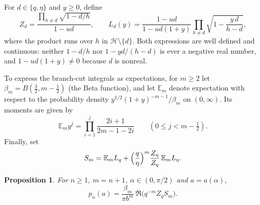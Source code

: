 \documentclass[11pt]{amsart}
\newtheorem{proposition}[theorem]{Proposition}
\theoremstyle{remark}
\newcommand{\E}{\mathbb{E}}
\begin{document}
For $d\in\{q,\eta\}$ and $y\ge0$, define
\[
 Z_d=\frac{\prod_{h\ne d}\sqrt{1-d/h}}{1-ud},\qquad
 L_d(y)=\frac{1-ud}{1-ud(1+y)}\prod_{h\ne d}\sqrt{1-\frac{y\,d}{h-d}},
\]
where the product runs over $h$ in $\mathcal H\setminus\{d\}$. Both
expressions are well defined and continuous: neither $1-d/h$ nor
$1-yd/(h-d)$ is ever a negative real number, and $1-ud(1+y)\ne0$ because $d$
is nonreal.

To express the branch-cut integrals as expectations, for $m\ge2$ let
$\beta_m=B(\tfrac32,m-\tfrac12)$ (the Beta function), and let $\E_m$ denote
expectation with respect to the probability density
$y^{1/2}(1+y)^{-m-1}/\beta_m$ on $(0,\infty)$. Its moments are given by
\begin{equation}\label{eq:moments}
 \E_m y^j=\prod_{i=1}^{j}\frac{2i+1}{2m-1-2i}\qquad(0\le j<m-\tfrac12).
\end{equation}
Finally, set
\[
 S_m=\E_mL_q+\Bigl(\frac q\eta\Bigr)^{m}\frac{Z_\eta}{Z_q}\,\E_mL_\eta .
\]

\begin{proposition}\label{prop:integral}
For $n\ge1$, $m=n+1$, $\alpha\in(0,\pi/2)$ and $a=a(\alpha)$,
\[
 p_n(a)=\frac{\beta_m}{\pi b^m}\,\Re\bigl(q^{-m}Z_qS_m\bigr).
\]
\end{proposition}
\end{document}
